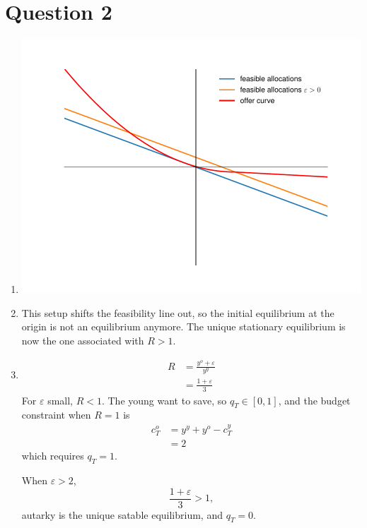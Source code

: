 \documentclass[11pt]{article}
\begin{document}
\section{Question 2}
\label{sec:org3d38114}
\begin{enumerate}
\item \begin{center}\includegraphics[width=\textwidth, keepaspectratio=true]{offer_curve.pdf}\end{center}
\item 
This setup shifts the feasibility line out, so the initial equilibrium at the origin is not an equilibrium anymore. The unique stationary equilibrium is now the one associated with $R > 1$.
\item
\begin{align*}
R &= \frac{y^o + \varepsilon}{y^y}\\
&= \frac{1 + \varepsilon}{3}
\end{align*}
For $\varepsilon$ small, $R < 1$. The young want to save, so $q_T \in [0, 1]$, and the budget constraint when $R = 1$ is
\begin{align*}
c_T^o &= y^y + y^o - c^y_T \\
&= 2
\end{align*}
which requires $q_T = 1$.


When $\varepsilon > 2$,
\[
\frac{1 + \varepsilon}{3} > 1,
\]
autarky is the unique satable equilibrium, and $q_T = 0$.
\end{enumerate}
\end{document}
